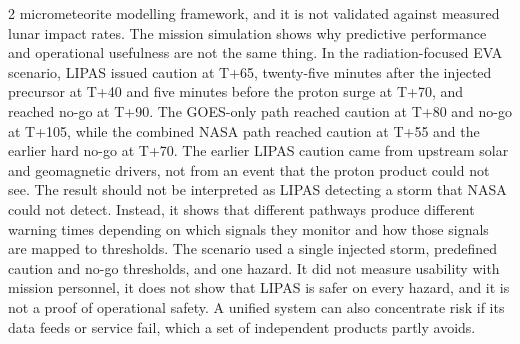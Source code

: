 \begin{multicols}{2}
micrometeorite modelling framework, and it is not validated against measured lunar impact rates. The mission simulation shows why predictive performance and operational usefulness are not the same thing. In the radiation-focused EVA scenario, LIPAS issued caution at T+65, twenty-five minutes after the injected precursor at T+40 and five minutes before the proton surge at T+70, and reached no-go at T+90. The GOES-only path reached caution at T+80 and no-go at T+105, while the combined NASA path reached caution at T+55 and the earlier hard no-go at T+70. The earlier LIPAS caution came from upstream solar and geomagnetic drivers, not from an event that the proton product could not see. The result should not be interpreted as LIPAS detecting a storm that NASA could not detect. Instead, it shows that different pathways produce different warning times depending on which signals they monitor and how those signals are mapped to thresholds. The scenario used a single injected storm, predefined caution and no-go thresholds, and one hazard. It did not measure usability with mission personnel, it does not show that LIPAS is safer on every hazard, and it is not a proof of operational safety. A unified system can also concentrate risk if its data feeds or service fail, which a set of independent products partly avoids.


\end{multicols}
